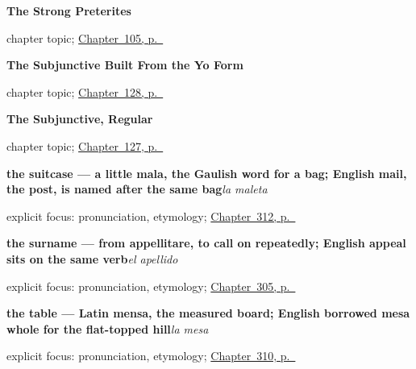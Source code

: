 \noindent\begin{minipage}[t]{\linewidth}
\raggedright
\textbf{The Strong Preterites}\par
\footnotesize chapter topic; \hyperref[ch:spanish-preterito-fuerte]{Chapter~105, p.~\pageref*{ch:spanish-preterito-fuerte}}
\end{minipage}\par\smallskip

\noindent\begin{minipage}[t]{\linewidth}
\raggedright
\textbf{The Subjunctive Built From the Yo Form}\par
\footnotesize chapter topic; \hyperref[ch:spanish-subjuntivo-yo-stem]{Chapter~128, p.~\pageref*{ch:spanish-subjuntivo-yo-stem}}
\end{minipage}\par\smallskip

\noindent\begin{minipage}[t]{\linewidth}
\raggedright
\textbf{The Subjunctive, Regular}\par
\footnotesize chapter topic; \hyperref[ch:spanish-subjuntivo-regular]{Chapter~127, p.~\pageref*{ch:spanish-subjuntivo-regular}}
\end{minipage}\par\smallskip

\noindent\begin{minipage}[t]{\linewidth}
\raggedright
\textbf{the suitcase — a little mala, the Gaulish word for a bag; English mail, the post, is named after the same bag}\enspace\emph{la maleta}\par
\footnotesize explicit focus: pronunciation, etymology; \hyperref[ch:lo-que-llevas]{Chapter~312, p.~\pageref*{ch:lo-que-llevas}}
\end{minipage}\par\smallskip

\noindent\begin{minipage}[t]{\linewidth}
\raggedright
\textbf{the surname — from appellitare, to call on repeatedly; English appeal sits on the same verb}\enspace\emph{el apellido}\par
\footnotesize explicit focus: pronunciation, etymology; \hyperref[ch:nombre-y-apellido]{Chapter~305, p.~\pageref*{ch:nombre-y-apellido}}
\end{minipage}\par\smallskip

\noindent\begin{minipage}[t]{\linewidth}
\raggedright
\textbf{the table — Latin mensa, the measured board; English borrowed mesa whole for the flat-topped hill}\enspace\emph{la mesa}\par
\footnotesize explicit focus: pronunciation, etymology; \hyperref[ch:el-cuarto-y-la-mesa]{Chapter~310, p.~\pageref*{ch:el-cuarto-y-la-mesa}}
\end{minipage}\par\smallskip

